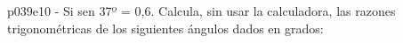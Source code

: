 \documentclass[spanish, 11pt]{exam}
\begin{document}
\begin{questions}
\begin{multicols}{2}
\begin{parts}
        \end{parts}
        \end{multicols}
        \question p039e10 - Si sen 37º = 0,6. Calcula, sin usar la calculadora, las razones trigonométricas de los siguientes ángulos dados en grados:
        \begin{multicols}{2} 
        \end{multicols}
        
    \end{questions}
    
\end{document}
